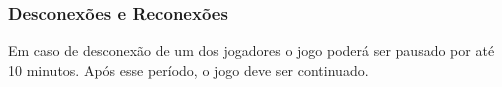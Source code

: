 \subsubsection{Desconexões e Reconexões}

Em caso de desconexão de um dos jogadores o jogo poderá ser pausado por até 10 minutos. Após esse período, o jogo deve ser continuado.